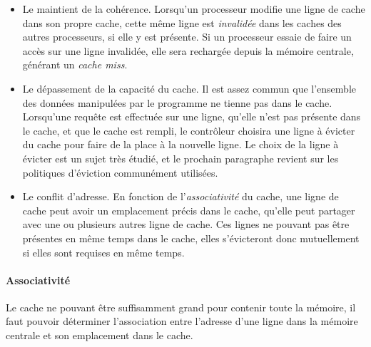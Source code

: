 \begin{itemize}
  \item Le maintient de la cohérence. Lorsqu'un processeur modifie une ligne de cache dans son propre cache, cette même ligne est \emph{invalidée} dans les caches des autres processeurs, si elle y est présente.
Si un processeur essaie de faire un accès sur une ligne invalidée, elle sera rechargée depuis la mémoire centrale, générant un \emph{cache miss}.
  \item Le dépassement de la capacité du cache. Il est assez commun que l'ensemble des données manipulées par le programme ne tienne pas dans le cache.
Lorsqu'une requête est effectuée sur une ligne, qu'elle n'est pas présente dans le cache, et que le cache est rempli, le contrôleur choisira une ligne à évicter du cache pour faire de la place à la nouvelle ligne.
Le choix de la ligne à évicter est un sujet très étudié, et le prochain paragraphe revient sur les politiques d'éviction communément utilisées.
  \item Le conflit d'adresse. En fonction de l'\emph{associativité} du cache, une ligne de cache peut avoir un emplacement précis dans le cache, qu'elle peut partager avec une ou plusieurs autres ligne de cache.
Ces lignes ne pouvant pas être présentes en même temps dans le cache, elles s'évicteront donc mutuellement si elles sont requises en même temps.
\end{itemize}



\paragraph{Associativité}

Le cache ne pouvant être suffisamment grand pour contenir toute la mémoire, il faut pouvoir déterminer l'association entre l'adresse d'une ligne dans la mémoire centrale et son emplacement dans le cache.

